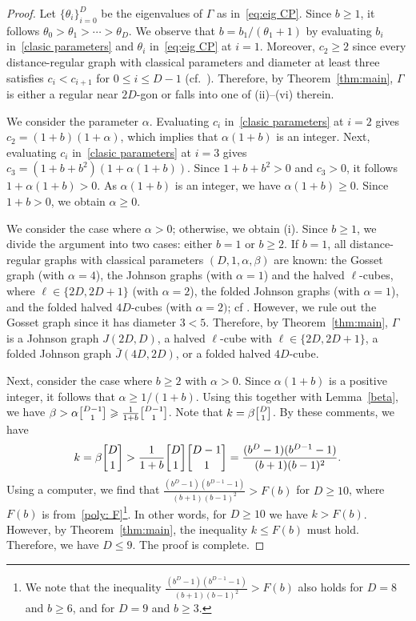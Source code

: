 \documentclass[11pt]{article}
\theoremstyle{definition}
\numberwithin{equation}{section}
\numberwithin{equation}{section}
\begin{document}
\begin{proof}
Let $\{\theta_i\}^D_{i=0}$ be the eigenvalues of $\Gamma$ as in~\eqref{eq:eig CP}. 
Since $b\geqslant 1$, it follows $\theta_0 > \theta_1> \cdots > \theta_D$.
We observe that $b = {b_1}/(\theta_1 + 1)$ by evaluating $b_i$ in~\eqref{clasic parameters} and $\theta_i$ in~\eqref{eq:eig CP} at $i=1$.
Moreover, $c_2 \geqslant 2$ since every distance-regular graph with classical parameters and diameter at least three satisfies $c_i < c_{i+1}$ for $0\leqslant i \leqslant D-1$ (cf.~\cite[Theorem~6.1.2]{BCN}).
Therefore, by Theorem~\ref{thm:main}, $\Gamma$ is either a regular near $2D$-gon or falls into one of (ii)--(vi) therein.

We consider the parameter $\alpha$. 
Evaluating $c_i$ in~\eqref{clasic parameters} at $i=2$ gives $c_2=(1+b)(1+\alpha)$, which implies that $\alpha(1+b)$ is an integer. 
Next, evaluating $c_i$ in~\eqref{clasic parameters} at $i=3$ gives $c_3 = (1+b+b^2)(1+\alpha(1+b))$. Since $1+b+b^2 > 0$ and $c_3 > 0$, it follows $1+\alpha(1+b) > 0$.
As $\alpha(1+b)$ is an integer, we have $\alpha(1+b) \geqslant 0$.
Since $1+b > 0$, we obtain $\alpha \geqslant 0$.

We consider the case where $\alpha>0$; otherwise, we obtain (i).
Since $b\geqslant 1$, we divide the argument into two cases: either $b=1$ or $b\geqslant2$. 
If $b=1$, all distance-regular graphs with classical parameters $(D,1,\alpha,\beta)$ are known: the Gosset graph (with $\alpha =4$), the Johnson graphs (with $\alpha =1$) and the halved $\ell$-cubes, where $\ell \in \{2D,2D+1\}$ (with $\alpha =2$), the folded Johnson graphs (with $\alpha=1$), and the folded halved $4D$-cubes (with $\alpha=2)$; cf {\cite[Sections 6.1, 6.3]{BCN}}. 
However, we rule out the Gosset graph since it has diameter $3 < 5$. 
Therefore, by Theorem~\ref{thm:main}, $\Gamma$ is a Johnson graph $J(2D,D)$, a halved $\ell$-cube with $\ell \in \{2D,2D+1\}$, a folded Johnson graph $\bar{J}(4D,2D)$, or
a folded halved $4D$-cube.

Next, consider the case where $b\geqslant2$ with $\alpha>0$. 
Since $\alpha(1 + b)$ is a positive integer, it follows that $\alpha \geqslant 1/(1 + b)$.
Using this together with Lemma~\ref{beta}, we have $\beta > \alpha \genfrac{\lbrack}{\rbrack}{0pt}{}{D-1}{1} \geqslant \frac{1}{1+b}\genfrac{\lbrack}{\rbrack}{0pt}{}{D-1}{1}$.
Note that $k=\beta \genfrac{\lbrack}{\rbrack}{0pt}{}{D}{1}$.
By these comments, we have
\begin{align*}
	k = \beta \genfrac{\lbrack}{\rbrack}{0pt}{}{D}{1}
	> \frac{1}{1+b}\genfrac{\lbrack}{\rbrack}{0pt}{}{D}{1}\genfrac{\lbrack}{\rbrack}{0pt}{}{D-1}{1}
	= \frac{(b^D-1)(b^{D-1}-1)}{(b+1)(b-1)^2}.
\end{align*}
Using a computer, we find that $\frac{(b^D-1)(b^{D-1}-1)}{(b+1)(b-1)^2} >F(b)$ for $D\geqslant 10$, where $F(b)$ is from~\eqref{poly: F}\footnote{
We note that the inequality $\frac{(b^D-1)(b^{D-1}-1)}{(b+1)(b-1)^2} >F(b)$ also holds for $D=8$ and $b\geqslant 6$, and for $D=9$ and $b\geqslant 3$.}.
In other words, for $D\geqslant 10$ we have $k > F(b)$.
However, by Theorem~\ref{thm:main}, the inequality $k \leqslant F(b)$ must hold. 
Therefore, we have $D \leqslant 9$. 
The proof is complete.
\end{proof}
\end{document}
